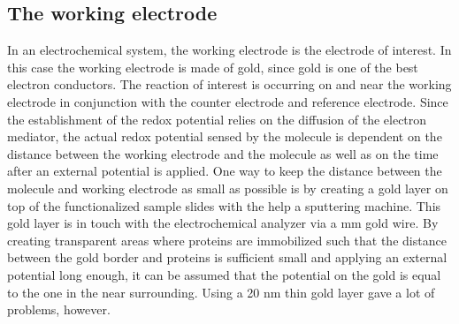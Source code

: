 \documentclass[twoside,single]{lion-msc}
\begin{document}
\subsection{The working electrode}
In an electrochemical system, the working electrode is the electrode of interest. In this case the working electrode is made of gold, since gold is one of the best electron conductors. The reaction of interest is occurring on and near the working electrode in conjunction with the counter electrode and reference electrode. Since the establishment of the redox potential relies on the diffusion of the electron mediator, the actual redox potential sensed by the molecule is dependent on the distance between the working electrode and the molecule as well as on the time after an external potential is applied. One way to keep the distance between the molecule and working electrode as small as possible is by creating a gold layer on top of the functionalized sample slides with the help a sputtering machine. This gold layer is in touch with the electrochemical analyzer via a  mm gold wire.  By creating transparent areas where proteins are immobilized such that the distance between the gold border and proteins is sufficient small and applying an external potential long enough, it can be assumed that the potential on the gold is equal to the one in the near surrounding. Using a 20 nm thin gold layer gave a lot of problems, however. 
\end{document}
